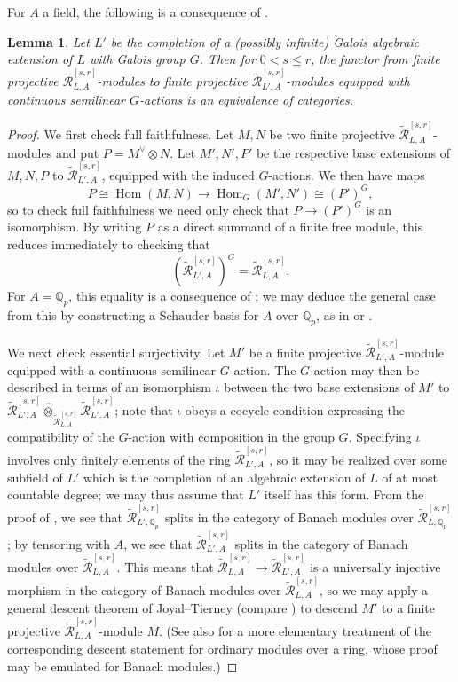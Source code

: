 \documentclass[12pt]{amsart}
\newtheorem{lemma}[theorem]{Lemma}
\theoremstyle{definition}
\numberwithin{equation}{theorem}
\newcommand{\QQ}{\mathbb{Q}}
\newcommand{\calR}{\mathcal{R}}
\newcommand{\dual}{\vee}
\DeclareMathOperator{\Hom}{Hom}
\begin{document}
For $A$ a field, the following is a consequence of \cite[Theorem~3.5.8]{kedlaya-liu2}.
\begin{lemma} \label{L:Witt module descend}
Let $L'$ be the completion of a (possibly infinite) Galois algebraic extension of $L$ with Galois group $G$. Then for $0 < s \leq r$, the functor from finite projective $\tilde{\calR}^{[s,r]}_{L,A}$-modules to finite projective
$\tilde{\calR}^{[s,r]}_{L',A}$-modules equipped with continuous semilinear $G$-actions is an equivalence of categories.
\end{lemma}
\begin{proof}
We first check full faithfulness.
Let $M,N$ be two finite projective $\tilde{\calR}^{[s,r]}_{L,A}$-modules
and put $P = M^\dual \otimes N$. Let $M',N',P'$ be the respective base extensions of $M,N,P$ to $\tilde{\calR}^{[s,r]}_{L',A}$, equipped with the induced $G$-actions. 
We then have maps
\[
P \cong \Hom(M,N) \to \Hom_G(M',N') \cong (P')^G,
\]
so to check full faithfulness we need only check that $P \to (P')^G$ is an isomorphism.
By writing $P$ as a direct summand of a finite free module, this reduces immediately to checking that 
\[
(\tilde{\calR}^{[s,r]}_{L',A})^G = \tilde{\calR}^{[s,r]}_{L,A}.
\]
For $A = \QQ_p$, this equality is a consequence of \cite[Theorem~9.2.15]{kedlaya-liu1};
we may deduce the general case from this by constructing a Schauder basis for $A$ over $\QQ_p$, as in \cite[Proposition~2.7.2/3]{bgr} or \cite[Lemma~2.2.9(b)]{kedlaya-liu1}.

We next check essential surjectivity.
Let $M'$ be a finite projective $\tilde{\calR}^{[s,r]}_{L',A}$-module equipped with a continuous semilinear $G$-action. The $G$-action may then be described in terms of an isomorphism $\iota$ between the two base extensions of $M'$ to $\tilde{\calR}^{[s,r]}_{L',A} \widehat{\otimes}_{\tilde{\calR}^{[s,r]}_{L,A}} \tilde{\calR}^{[s,r]}_{L',A}$;
note that $\iota$ obeys a cocycle condition expressing the compatibility of the $G$-action with composition in the group $G$. Specifying $\iota$ involves only finitely elements of the ring $\tilde{\calR}^{[s,r]}_{L',A}$, so it may be realized over some subfield of $L'$ which is the completion of an algebraic extension of $L$ of at most countable degree; we may thus assume that $L'$ itself has this form. From the proof of \cite[Theorem~9.2.15]{kedlaya-liu1}, we see that $\tilde{\calR}^{[s,r]}_{L',\QQ_p}$ splits in the category of Banach modules over $\tilde{\calR}^{[s,r]}_{L,\QQ_p}$; by tensoring with $A$, we see that
$\tilde{\calR}^{[s,r]}_{L',A}$ splits in the category of Banach modules over $\tilde{\calR}^{[s,r]}_{L,A}$.
This means that $\tilde{\calR}^{[s,r]}_{L,A} \to \tilde{\calR}^{[s,r]}_{L',A}$ is a universally injective morphism in the category of Banach modules over $\tilde{\calR}^{[s,r]}_{L,A}$, so we may apply a general descent theorem of Joyal--Tierney \cite{joyal-tierney}
(compare \cite[Lemma~1.2.17]{kedlaya-liu2}) to descend $M'$ to a finite projective $\tilde{\calR}^{[s,r]}_{L,A}$-module $M$. (See also \cite[Tag~08WE]{stacks-project} for a more elementary treatment of the corresponding descent statement for ordinary modules over a ring,
whose proof may be emulated for Banach modules.)
\end{proof}
\end{document}
